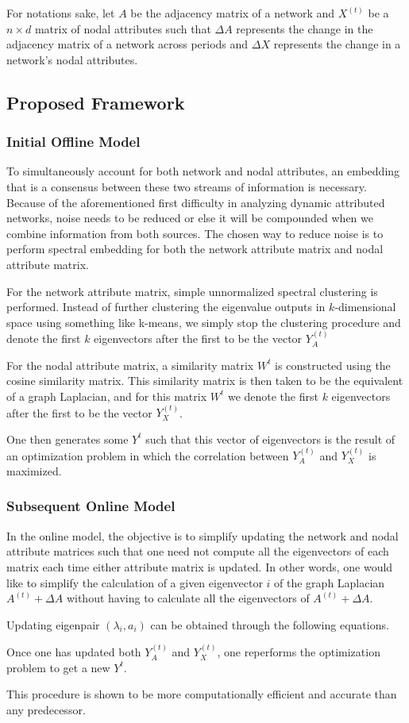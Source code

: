 \documentclass{article}
\begin{document}
For notations sake, let $A$ be the adjacency matrix of a network and $X^{(t)}$ be a $n \times d$ matrix of nodal attributes such that $\Delta A$ represents the change in the adjacency matrix of a network across periods and $\Delta X$ represents the change in a network's nodal attributes. 

\subsection{Proposed Framework}

\subsubsection{Initial Offline Model}

To simultaneously account for both network and nodal attributes, an embedding that is a consensus between these two streams of information is necessary. Because of the aforementioned first difficulty in analyzing dynamic attributed networks, noise needs to be reduced or else it will be compounded when we combine information from both sources. The chosen way to reduce noise is to perform spectral embedding for both the network attribute matrix and nodal attribute matrix.

For the network attribute matrix, simple unnormalized spectral clustering is performed. Instead of further clustering the eigenvalue outputs in $k$-dimensional space using something like k-means, we simply stop the clustering procedure and denote the first $k$ eigenvectors after the first to be the vector $Y_{A}^{(t)}$

For the nodal attribute matrix, a similarity matrix $W^{t}$ is constructed using the cosine similarity matrix. This similarity matrix is then taken to be the equivalent of a graph Laplacian, and for this matrix $W^{t}$ we denote the first $k$ eigenvectors after the first to be the vector $Y_{X}^{(t)}$.

One then generates some $Y^{t}$ such that this vector of eigenvectors is the result of an optimization problem in which the correlation between $Y_{A}^{(t)}$ and $Y_{X}^{(t)}$ is maximized.

\subsubsection{Subsequent Online Model}

In the online model, the objective is to simplify updating the network and nodal attribute matrices such that one need not compute all the eigenvectors of each matrix each time either attribute matrix is updated. In other words, one would like to simplify the calculation of a given eigenvector $i$ of the graph Laplacian $A^{(t)} + \Delta A$ without having to calculate all the eigenvectors of $A^{(t)} + \Delta A$.

Updating eigenpair $(\lambda_i, a_i)$ can be obtained through the following equations.

Once one has updated both $Y_{A}^{(t)}$ and $Y_{X}^{(t)}$, one reperforms the optimization problem to get a new $Y^{t}$.

This procedure is shown to be more computationally efficient and accurate than any predecessor.
\end{document}
